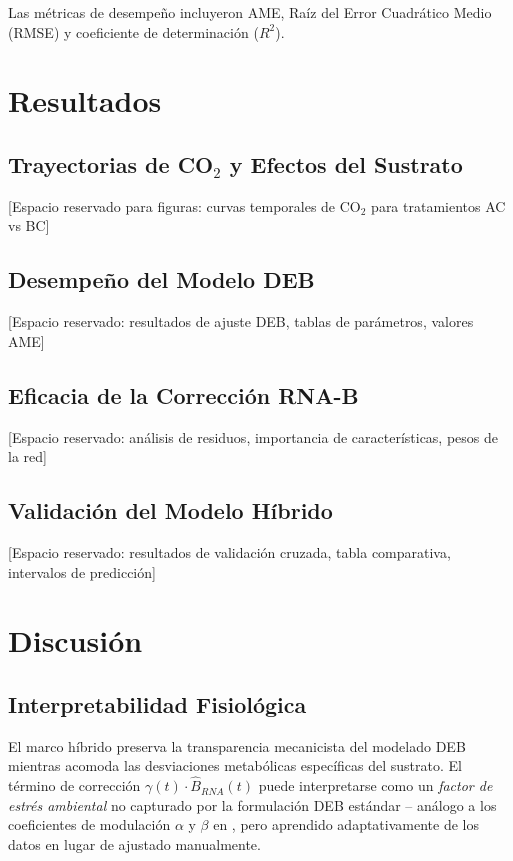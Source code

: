 \documentclass[12pt,a4paper]{article}
\begin{document}
Las m\'{e}tricas de desempe\~{n}o incluyeron AME, Ra\'{i}z del Error Cuadr\'{a}tico Medio (RMSE) y coeficiente de determinaci\'{o}n ($R^2$).

\section{Resultados}

\subsection{Trayectorias de CO$_2$ y Efectos del Sustrato}

[Espacio reservado para figuras: curvas temporales de CO$_2$ para tratamientos AC vs BC]

\subsection{Desempe\~{n}o del Modelo DEB}

[Espacio reservado: resultados de ajuste DEB, tablas de par\'{a}metros, valores AME]

\subsection{Eficacia de la Correcci\'{o}n RNA-B}

[Espacio reservado: an\'{a}lisis de residuos, importancia de caracter\'{i}sticas, pesos de la red]

\subsection{Validaci\'{o}n del Modelo H\'{i}brido}

[Espacio reservado: resultados de validaci\'{o}n cruzada, tabla comparativa, intervalos de predicci\'{o}n]

\section{Discusi\'{o}n}

\subsection{Interpretabilidad Fisiol\'{o}gica}

El marco h\'{i}brido preserva la transparencia mecanicista del modelado DEB mientras acomoda las desviaciones metab\'{o}licas espec\'{i}ficas del sustrato. El t\'{e}rmino de correcci\'{o}n $\gamma(t) \cdot \hat{B}_{RNA}(t)$ puede interpretarse como un \textit{factor de estr\'{e}s ambiental} no capturado por la formulaci\'{o}n DEB est\'{a}ndar -- an\'{a}logo a los coeficientes de modulaci\'{o}n $\alpha$ y $\beta$ en \citet{eriksenDynamicModellingFeed2022}, pero aprendido adaptativamente de los datos en lugar de ajustado manualmente.
\end{document}
